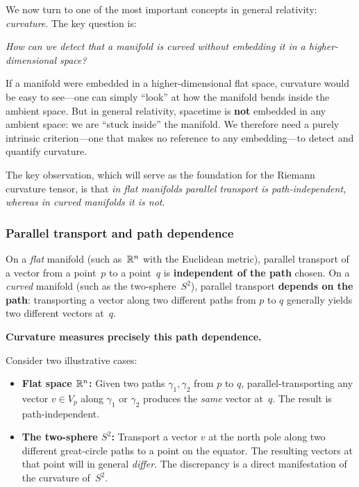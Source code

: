 We now turn to one of the most important concepts in general
relativity: \emph{curvature}.  The key question is:

\begin{center}
  \itshape How can we detect that a manifold is curved
  without embedding it in a higher-dimensional space?
\end{center}

\noindent
If a manifold were embedded in a higher-dimensional flat space,
curvature would be easy to see---one can simply ``look'' at how
the manifold bends inside the ambient space.  But in general
relativity, spacetime is \textbf{not} embedded in any ambient
space: we are ``stuck inside'' the manifold.  We therefore need a
purely intrinsic criterion---one that makes no reference to any
embedding---to detect and quantify curvature.

The key observation, which will serve as the foundation for the
Riemann curvature tensor, is that \emph{in flat manifolds
parallel transport is path-independent, whereas in curved
manifolds it is not}.

\subsubsection{Parallel transport and path dependence}%
\label{sec:parallel-transport-curvature}

\begin{intuition}
  On a \emph{flat} manifold (such as~$\mathbb{R}^{n}$ with the
  Euclidean metric), parallel transport of a vector from a
  point~$p$ to a point~$q$ is \textbf{independent of the path}
  chosen.  On a \emph{curved} manifold (such as the
  two-sphere~$S^2$), parallel transport \textbf{depends on the
  path}: transporting a vector along two different paths from $p$
  to $q$ generally yields two different vectors at~$q$.

  \medskip
  \textbf{Curvature measures precisely this path dependence.}
\end{intuition}

Consider two illustrative cases:
\begin{itemize}
  \item \textbf{Flat space $\mathbb{R}^{n}$:}\;
    Given two paths $\gamma_1,\gamma_2$ from $p$ to $q$,
    parallel-transporting any vector $v\in V_p$ along
    $\gamma_1$ or $\gamma_2$ produces the \emph{same} vector
    at~$q$.  The result is path-independent.
  \item \textbf{The two-sphere $S^2$:}\;
    Transport a vector $v$ at the north pole along two different
    great-circle paths to a point on the equator.  The resulting
    vectors at that point will in general \emph{differ}.  The
    discrepancy is a direct manifestation of the curvature
    of~$S^2$.
\end{itemize}

